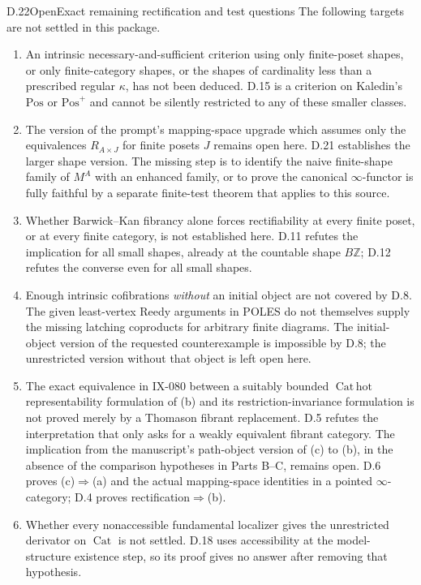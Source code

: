 \begin{result}{D.22}{Open}{Exact remaining rectification and test questions}
The following targets are not settled in this package.
\begin{enumerate}
\item An intrinsic necessary-and-sufficient criterion using only
      finite-poset shapes, or only finite-category shapes, or the
      shapes of cardinality less than a prescribed regular
      $\kappa$, has not been deduced. D.15 is a criterion on
      Kaledin's $\mathrm{Pos}$ or $\mathrm{Pos}^{+}$ and cannot be
      silently restricted to any of these smaller classes.
\item The version of the prompt's mapping-space upgrade which
      assumes only the equivalences $R_{A\times J}$ for finite
      posets $J$ remains open here. D.21 establishes the larger
      shape version. The missing step is to identify the naive
      finite-shape family of $M^A$ with an enhanced family, or to
      prove the canonical $\infty$-functor is fully faithful by a
      separate finite-test theorem that applies to this source.
\item Whether Barwick--Kan fibrancy alone forces rectifiability
      at every finite poset, or at every finite category, is not
      established here. D.11 refutes the implication for all small
      shapes, already at the countable shape $B\mathbb Z$; D.12
      refutes the converse even for all small shapes.
\item Enough intrinsic cofibrations \emph{without} an initial
      object are not covered by D.8. The given least-vertex Reedy
      arguments in POLES do not themselves supply the missing
      latching coproducts for arbitrary finite diagrams. The
      initial-object version of the requested counterexample is
      impossible by D.8; the unrestricted version without that
      object is left open here.
\item The exact equivalence in IX-080 between a suitably bounded
      $\operatorname{Cat\,hot}$ representability formulation of
      (b) and its restriction-invariance formulation is not proved
      merely by a Thomason fibrant replacement. D.5 refutes the
      interpretation that only asks for a weakly equivalent
      fibrant category. The implication from the manuscript's
      path-object version of (c) to (b), in the absence of the
      comparison hypotheses in Parts B--C, remains open. D.6
      proves (c)$\Rightarrow$(a) and the actual mapping-space
      identities in a pointed $\infty$-category; D.4 proves
      rectification$\Rightarrow$(b).
\item Whether every nonaccessible fundamental localizer gives
      the unrestricted derivator on $\operatorname{Cat}$ is not
      settled. D.18 uses accessibility at the model-structure
      existence step, so its proof gives no answer after removing
      that hypothesis.
\end{enumerate}
\end{result}
